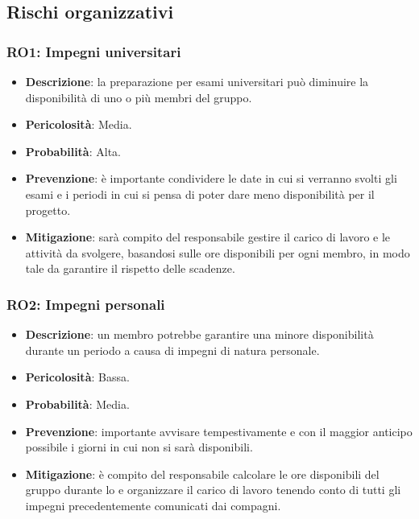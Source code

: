 \subsection{Rischi organizzativi}

\subsubsection{RO1: Impegni universitari}
\begin{itemize}
    \item \textbf{Descrizione}: la preparazione per esami universitari può diminuire la disponibilità di uno o più membri del gruppo.
    \item \textbf{Pericolosità}: Media.
    \item \textbf{Probabilità}: Alta.
    \item \textbf{Prevenzione}: è importante condividere le date in cui si verranno svolti gli esami e i periodi in cui si pensa di poter dare meno disponibilità per il progetto.
    \item \textbf{Mitigazione}: sarà compito del responsabile gestire il carico di lavoro e le attività da svolgere, basandosi sulle ore disponibili per ogni membro, in modo tale da garantire il rispetto delle scadenze. 
\end{itemize}

\subsubsection{RO2: Impegni personali}
\begin{itemize}
    \item \textbf{Descrizione}: un membro potrebbe garantire una minore disponibilità durante un periodo a causa di impegni di natura personale.
    \item \textbf{Pericolosità}: Bassa.
    \item \textbf{Probabilità}: Media.
    \item \textbf{Prevenzione}: importante avvisare tempestivamente e con il maggior anticipo possibile i giorni in cui non si sarà disponibili. 
    \item \textbf{Mitigazione}: è compito del responsabile calcolare le ore disponibili del gruppo durante lo  e organizzare il carico di lavoro tenendo conto di tutti gli impegni precedentemente comunicati dai compagni. 
\end{itemize}

